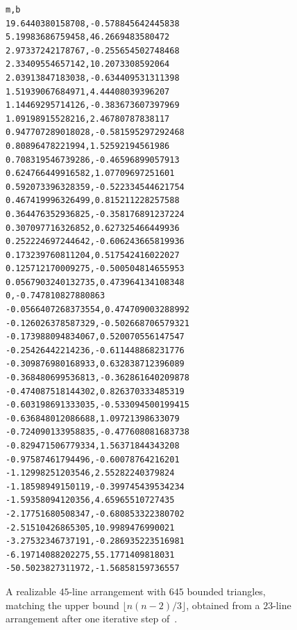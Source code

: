 \begin{figure}[!hp]
\centering
{}\label{tab:41-coefficients}
\small
\begin{verbatim}
m,b
19.6440380158708,-0.578845642445838
5.19983686759458,46.2669483580472
2.97337242178767,-0.255654502748468
2.33409554657142,10.2073308592064
2.03913847183038,-0.634409531311398
1.51939067684971,4.44408039396207
1.14469295714126,-0.383673607397969
1.09198915528216,2.46780787838117
0.947707289018028,-0.581595297292468
0.80896478221994,1.52592194561986
0.708319546739286,-0.46596899057913
0.624766449916582,1.07709697251601
0.592073396328359,-0.522334544621754
0.467419996326499,0.815211228257588
0.364476352936825,-0.358176891237224
0.307097716326852,0.627325466449936
0.252224697244642,-0.606243665819936
0.173239760811204,0.517542416022027
0.125712170009275,-0.500504814655953
0.0567903240132735,0.473964134108348
0,-0.747810827880863
-0.0566407268373554,0.474709003288992
-0.126026378587329,-0.502668706579321
-0.173988094834067,0.520070556147547
-0.25426442214236,-0.611448868231776
-0.309876980168933,0.632838712396089
-0.368480699536813,-0.362861640209878
-0.474087518144302,0.826370333485319
-0.603198691333035,-0.533094500199415
-0.636848012086688,1.09721398633079
-0.724090133958835,-0.477608081683738
-0.829471506779334,1.56371844343208
-0.97587461794496,-0.60078764216201
-1.12998251203546,2.55282240379824
-1.18598949150119,-0.399745439534234
-1.59358094120356,4.65965510727435
-2.17751680508347,-0.680853322380702
-2.51510426865305,10.9989476990021
-3.27532346737191,-0.286935223516981
-6.19714088202275,55.1771409818031
-50.5023827311972,-1.56858159736557
\end{verbatim}
\end{figure}

\begin{figure}[!hp]
\centering

\caption{A realizable $45$-line arrangement with $645$ bounded triangles,
matching the upper bound $\lfloor n(n-2)/3 \rfloor$, obtained
from a $23$-line arrangement after one iterative step of~\cite{forge1998}.}
\label{fig:45-from-23-lines}
\end{figure}

